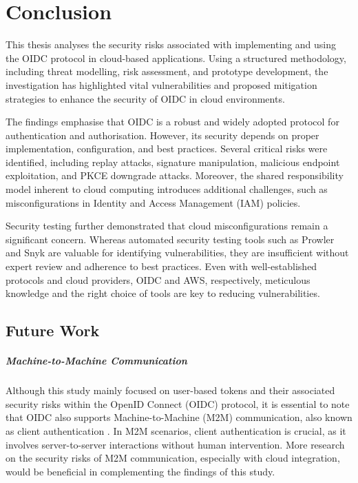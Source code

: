 \chapter{Conclusion}

This thesis analyses the security risks associated with implementing and using the OIDC protocol in cloud-based applications. Using a structured methodology, including threat modelling, risk assessment, and prototype development, the investigation has highlighted vital vulnerabilities and proposed mitigation strategies to enhance the security of OIDC in cloud environments.

The findings emphasise that OIDC is a robust and widely adopted protocol for authentication and authorisation. However, its security depends on proper implementation, configuration, and best practices. Several critical risks were identified, including replay attacks, signature manipulation, malicious endpoint exploitation, and PKCE downgrade attacks. Moreover, the shared responsibility model inherent to cloud computing introduces additional challenges, such as misconfigurations in Identity and Access Management (IAM) policies.

Security testing further demonstrated that cloud misconfigurations remain a significant concern. Whereas automated security testing tools such as Prowler and Snyk are valuable for identifying vulnerabilities, they are insufficient without expert review and adherence to best practices. Even with well-established protocols and cloud providers, OIDC and AWS, respectively, meticulous knowledge and the right choice of tools are key to reducing vulnerabilities.   


\section{Future Work}

    \paragraph{Machine-to-Machine Communication} Although this study mainly focused on user-based tokens and their associated security risks within the OpenID Connect (OIDC) protocol, it is essential to note that OIDC also supports Machine-to-Machine (M2M) communication, also known as client authentication \citep{openid_docs}. In M2M scenarios, client authentication is crucial, as it involves server-to-server interactions without human intervention. More research on the security risks of M2M communication, especially with cloud integration, would be beneficial in complementing the findings of this study.

